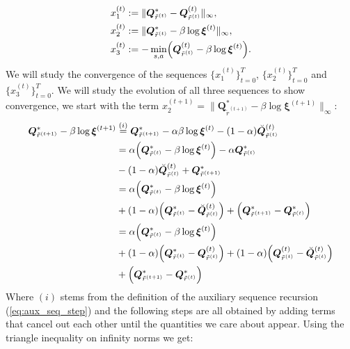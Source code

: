 \begin{align}
    \label{eq:term_1}
    x_1^{(t)} &:= \| \bm{Q}^*_{\tilde{r}^{(t)}}
    -\bm{Q}^{(t)}_{\tilde{r}^{(t)}} \|_\infty, \\
    \label{eq:term_2}
    x_2^{(t)} &:= \| \bm{Q}_{\tilde{r}^{(t)}}^*
    - \beta \log \bm{\xi}^{(t)} \|_\infty, \\
    \label{eq:term_3}
    x_3^{(t)} &:= -\min_{s,a} \Bigl(\bm{Q}^{(t)}_{\tilde{r}^{(t)}} - \beta \log \bm{\xi}^{(t)}  \Bigr).
\end{align}
We will study the convergence of the sequences $\{x_1^{(t)}\}_{t=0}^T$, $\{x_2^{(t)}\}_{t=0}^T$ and $\{x_3^{(t)}\}_{t=0}^T$. We will study the evolution of all three sequences to show convergence, we start with the term $x_2^{(t+1)} = \|\bm{Q}_{\tilde{r}^{(t+1)}}^* - \beta \log \bm{\xi}^{(t+1)} \|_\infty$:
\begin{align*}
    \bm{Q}_{\tilde{r}^{(t+1)}}^* - \beta \log \bm{\xi}^{(t+1)}  
    &\stackrel{(i)}{=} \bm{Q}_{\tilde{r}^{(t+1)}}^* 
    - \alpha \beta \log \bm{\xi}^{(t)}
    - (1-\alpha) \breve{\bm{Q}}^{(t)}_{\tilde{r}^{(t)}} \\
    &= \alpha \Big( \bm{Q}_{\tilde{r}^{(t)}}^* 
    -  \beta \log \bm{\xi}^{(t)}  \Big) - \alpha \bm{Q}_{\tilde{r}^{(t)}}^*  \\ &
    - (1-\alpha) \breve{\bm{Q}}^{(t)}_{\tilde{r}^{(t)}}  + \bm{Q}_{\tilde{r}^{(t+1)}}^*  \\
    &= \alpha \Big( \bm{Q}_{\tilde{r}^{(t)}}^* 
    -  \beta \log \bm{\xi}^{(t)}  \Big) \\ &
    + (1-\alpha) \Big( \bm{Q}_{\tilde{r}^{(t)}}^*   - \breve{\bm{Q}}^{(t)}_{\tilde{r}^{(t)}}  \Big)
    + \Bigl(\bm{Q}_{\tilde{r}^{(t+1)}}^*  - \bm{Q}_{\tilde{r}^{(t)}}^*  \Bigr)\\
    &= \alpha \Big( \bm{Q}_{\tilde{r}^{(t)}}^* 
    -  \beta \log \bm{\xi}^{(t)}  \Big) \\ &
    + (1-\alpha) \Big( \bm{Q}_{\tilde{r}^{(t)}}^* - \bm{Q}_{\tilde{r}^{(t)}}^{(t)} \Big) 
    + (1-\alpha) \Big( 
    \bm{Q}_{\tilde{r}^{(t)}}^{(t)}
    - \breve{\bm{Q}}^{(t)}_{\tilde{r}^{(t)}}  \Big) \\ &
    + \Bigl(\bm{Q}_{\tilde{r}^{(t+1)}}^*  - \bm{Q}_{\tilde{r}^{(t)}}^*  \Bigr)
\end{align*}
Where $(i)$ stems from the definition of the auxiliary sequence recursion (\ref{eq:aux_seq_step}) and the following steps are all obtained by adding terms that cancel out each other until the quantities we care about appear. Using the triangle inequality on infinity norms we get:
